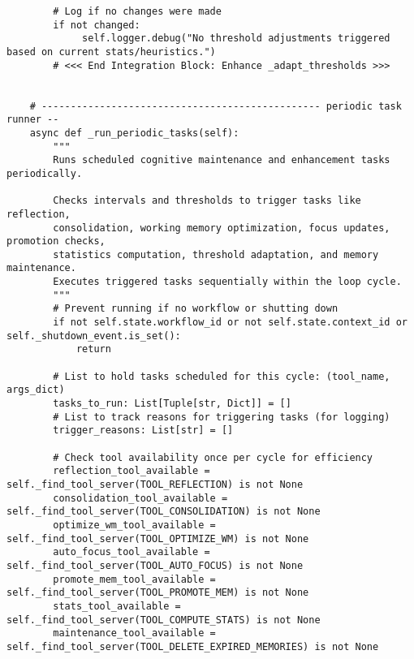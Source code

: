 \documentclass[12pt,a4paper]{article}
\begin{document}
\begin{pageablecode}
\begin{verbatim}
        # Log if no changes were made
        if not changed:
             self.logger.debug("No threshold adjustments triggered based on current stats/heuristics.")
        # <<< End Integration Block: Enhance _adapt_thresholds >>>


    # ------------------------------------------------ periodic task runner --
    async def _run_periodic_tasks(self):
        """
        Runs scheduled cognitive maintenance and enhancement tasks periodically.

        Checks intervals and thresholds to trigger tasks like reflection,
        consolidation, working memory optimization, focus updates, promotion checks,
        statistics computation, threshold adaptation, and memory maintenance.
        Executes triggered tasks sequentially within the loop cycle.
        """
        # Prevent running if no workflow or shutting down
        if not self.state.workflow_id or not self.state.context_id or self._shutdown_event.is_set():
            return

        # List to hold tasks scheduled for this cycle: (tool_name, args_dict)
        tasks_to_run: List[Tuple[str, Dict]] = []
        # List to track reasons for triggering tasks (for logging)
        trigger_reasons: List[str] = []

        # Check tool availability once per cycle for efficiency
        reflection_tool_available = self._find_tool_server(TOOL_REFLECTION) is not None
        consolidation_tool_available = self._find_tool_server(TOOL_CONSOLIDATION) is not None
        optimize_wm_tool_available = self._find_tool_server(TOOL_OPTIMIZE_WM) is not None
        auto_focus_tool_available = self._find_tool_server(TOOL_AUTO_FOCUS) is not None
        promote_mem_tool_available = self._find_tool_server(TOOL_PROMOTE_MEM) is not None
        stats_tool_available = self._find_tool_server(TOOL_COMPUTE_STATS) is not None
        maintenance_tool_available = self._find_tool_server(TOOL_DELETE_EXPIRED_MEMORIES) is not None


\end{verbatim}
\end{pageablecode}
\end{document}
